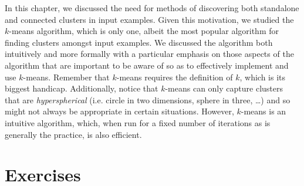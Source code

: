 In this chapter, we discussed the need for methods of discovering both standalone and connected clusters in input examples. Given this motivation, we studied the $k$-means algorithm, which is only one, albeit the most popular algorithm for finding clusters amongst input examples. We discussed the algorithm both intuitively and more formally with a particular emphasis on those aspects of the algorithm that are important to be aware of so as to effectively implement and use $k$-means. Remember that $k$-means requires the definition of $k$, which is its biggest handicap. Additionally, notice that $k$-means can only capture clusters that are \emph{hyperspherical} (i.e. circle in two dimensions, sphere in three, \dots) and so might not always be appropriate in certain situations. However, $k$-means is an intuitive algorithm, which, when run for a fixed number of iterations as is generally the practice, is also efficient. 

\section{Exercises}

